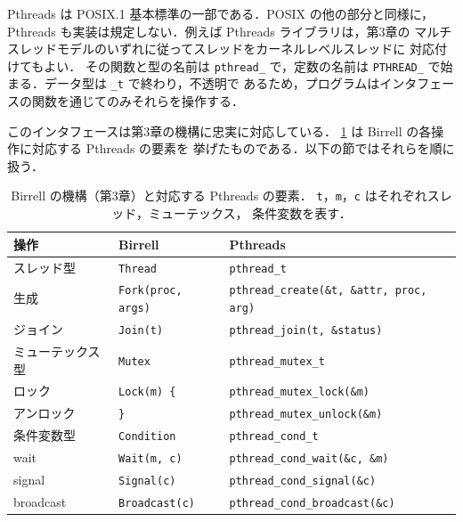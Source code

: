 \documentclass[../main.tex]{subfiles}
\begin{document}
Pthreads は POSIX.1 基本標準の一部である．POSIX の他の部分と同様に，
Pthreads も実装は規定しない．例えば Pthreads ライブラリは，第3章の
マルチスレッドモデルのいずれに従ってスレッドをカーネルレベルスレッドに
対応付けてもよい．
その関数と型の名前は \texttt{pthread\_} で，定数の名前は
\texttt{PTHREAD\_} で始まる．データ型は \texttt{\_t} で終わり，不透明で
あるため，プログラムはインタフェースの関数を通じてのみそれらを操作する．

このインタフェースは第3章の機構に忠実に対応している．
\cref{tab:l04-birrell} は Birrell の各操作に対応する Pthreads の要素を
挙げたものである．以下の節ではそれらを順に扱う．

\begin{table}[htbp]
  \centering
  \caption{Birrell の機構（第3章）と対応する Pthreads の要素．
    \texttt{t}，\texttt{m}，\texttt{c} はそれぞれスレッド，ミューテックス，
    条件変数を表す．}
  \label{tab:l04-birrell}
  \small
  \setlength{\tabcolsep}{3pt}
  \begin{tabular}{@{}lll@{}}
    \toprule
    操作 & Birrell & Pthreads \\
    \midrule
    スレッド型      & \texttt{Thread}           & \texttt{pthread\_t} \\
    生成            & \texttt{Fork(proc, args)}
                    & \texttt{pthread\_create(\&t, \&attr, proc, arg)} \\
    ジョイン        & \texttt{Join(t)}          & \texttt{pthread\_join(t, \&status)} \\
    \midrule
    ミューテックス型 & \texttt{Mutex}            & \texttt{pthread\_mutex\_t} \\
    ロック          & \texttt{Lock(m) \{}       & \texttt{pthread\_mutex\_lock(\&m)} \\
    アンロック      & \texttt{\}}               & \texttt{pthread\_mutex\_unlock(\&m)} \\
    \midrule
    条件変数型      & \texttt{Condition}        & \texttt{pthread\_cond\_t} \\
    wait            & \texttt{Wait(m, c)}       & \texttt{pthread\_cond\_wait(\&c, \&m)} \\
    signal          & \texttt{Signal(c)}        & \texttt{pthread\_cond\_signal(\&c)} \\
    broadcast       & \texttt{Broadcast(c)}     & \texttt{pthread\_cond\_broadcast(\&c)} \\
    \bottomrule
  \end{tabular}
\end{table}
\end{document}
